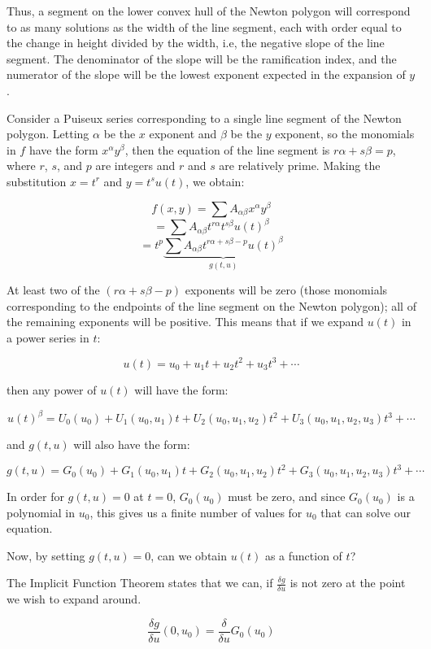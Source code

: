 Thus, a segment on the lower convex hull of the Newton polygon will
correspond to as many solutions as the width of the line segment, each
with order equal to the change in height divided by the width, i.e,
the negative slope of the line segment.  The denominator of the slope
will be the ramification index, and the numerator of the slope will be
the lowest exponent expected in the expansion of $y$.

Consider a Puiseux series
corresponding to a single line segment of the Newton polygon.
Letting
$\alpha$ be the $x$ exponent and $\beta$ be the $y$ exponent, so the
monomials in $f$ have the form $x^\alpha y^\beta$, then the equation
of the line segment is $r\alpha + s\beta = p$, where $r$, $s$, and $p$
are integers and $r$ and $s$ are relatively prime.  Making the
substitution $x=t^r$ and $y=t^s u(t)$, we obtain:

$$f(x,y) = \sum A_{\alpha\beta} x^\alpha y^\beta$$
$$ = \sum A_{\alpha\beta} t^{r \alpha} t^{s \beta} u(t)^\beta$$
$$ = t^p \underbrace{\sum A_{\alpha\beta} t^{r \alpha + s \beta - p} u(t)^\beta}_{g(t,u)}$$

At least two of the $(r \alpha + s \beta - p)$ exponents will be zero
(those monomials corresponding to the endpoints of the line segment on
the Newton polygon); all of the remaining exponents will be positive.
This means that if we expand $u(t)$ in a power series in $t$:

$$u(t) = u_0 + u_1 t + u_2 t^2 + u_3 t^3 + \cdots$$

then any power of $u(t)$ will have the form:

$$u(t)^\beta = U_0(u_0) + U_1(u_0, u_1) t + U_2(u_0, u_1, u_2) t^2 + U_3(u_0,u_1,u_2,u_3) t^3 + \cdots$$

and $g(t,u)$ will also have the form:

$$g(t,u) = G_0(u_0) + G_1(u_0, u_1) t + G_2(u_0, u_1, u_2) t^2 + G_3(u_0,u_1,u_2,u_3) t^3 + \cdots$$

In order for $g(t,u)=0$ at $t=0$, $G_0(u_0)$ must be zero, and since $G_0(u_0)$ is a polynomial
in $u_0$, this gives us a finite number of values for $u_0$ that can solve our equation.

Now, by setting $g(t,u)=0$, can we obtain $u(t)$ as a function of $t$?

The Implicit Function Theorem states that we can, if $\frac{\delta g}{\delta u}$ is not zero
at the point we wish to expand around.

$$\frac{\delta g}{\delta u}(0,u_0) = \frac{\delta}{\delta u} G_0(u_0)$$

